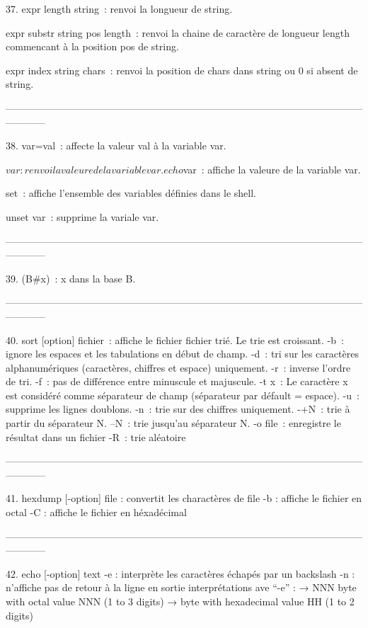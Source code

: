 \documentclass[a4paper, 10pt, onecolumn, openright, oneside]{book}
\begin{document}
    37. expr length string : renvoi la longueur de string.

expr substr string pos length : renvoi la chaine de caractère de longueur length commencant à la position pos de string.

expr index string chars : renvoi la position de chars dans string ou 0 si absent de string.

------------------------------------------------------------------------------------------------------------------------

    38. var=val : affecte la valeur val à la variable var.

$var : renvoi la valeure de la variable var.

echo $var : affiche la valeure de la variable var.

set : affiche l’ensemble des variables définies dans le shell.

unset var : supprime la variale var.

------------------------------------------------------------------------------------------------------------------------

    39. (B#x) : x dans la base B.

------------------------------------------------------------------------------------------------------------------------

    40. sort [option] fichier : affiche le fichier fichier trié. Le trie est croissant.
-b : ignore les espaces et les tabulations en début de champ.
-d : tri sur les caractères alphanumériques (caractères, chiffres et espace) uniquement.
-r : inverse l'ordre de tri.
-f : pas de différence entre minuscule et majuscule.
-t x : Le caractère x est considéré comme séparateur de champ (séparateur par défault = espace).
-u : supprime les lignes doublons.
-n : trie sur des chiffres uniquement.
-+N : trie à partir du séparateur N.
--N : trie jusqu'au séparateur N.
-o file : enregistre le résultat dans un fichier
-R : trie aléatoire

------------------------------------------------------------------------------------------------------------------------

    41. hexdump [-option] file : convertit les charactères de file
-b : affiche le fichier en octal
-C : affiche le fichier en héxadécimal

------------------------------------------------------------------------------------------------------------------------

    42. echo [-option] {text}
-e : interprète les caractères échapés par un backslash
-n : n'affiche pas de retour à la ligne en sortie
interprétations ave “-e” :
→ \0NNN  byte with octal value NNN (1 to 3 digits)
→ \xHH   byte with hexadecimal value HH (1 to 2 digits)
\end{document}
